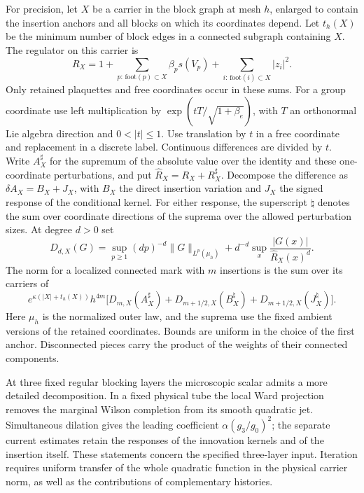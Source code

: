 \documentclass[11pt,letterpaper]{article}
\begin{document}
For precision, let \(X\) be a carrier in the block graph at mesh \(h\),
enlarged to contain the insertion anchors and all blocks on which its
coordinates depend. Let \(t_h(X)\) be the minimum number of block edges in
a connected subgraph containing \(X\). The regulator on this carrier is
\[
 R_X=1+\sum_{p:\,\mathrm{foot}(p)\subset X}\beta_p s(V_p)
          +\sum_{i:\,\mathrm{foot}(i)\subset X}|z_i|^2 .
\]
Only retained plaquettes and free coordinates occur in these sums.
For a group coordinate use left multiplication by
\(\exp(tT/\sqrt{1+\beta_e})\), with \(T\) an orthonormal Lie algebra
direction and \(0<|t|\le1\). Use translation by \(t\) in a free coordinate
and replacement in a discrete label. Continuous differences are divided by
\(t\). Write \(A_X^\sharp\) for the supremum of the absolute value over the
identity and these one-coordinate perturbations, and put
\(\widehat R_X=R_X+R_X^\sharp\). Decompose the difference as
\(\delta A_X=B_X+J_X\), with \(B_X\) the direct insertion variation and
\(J_X\) the signed response of the conditional kernel. For either response,
the superscript \(\natural\) denotes the sum over coordinate directions of the
suprema over the allowed perturbation sizes. At degree \(d>0\) set
\[
 D_{d,X}(G)=
 \sup_{p\ge1}(dp)^{-d}\|G\|_{L^p(\mu_h)}
       +d^{-d}\sup_x\frac{|G(x)|}{\widehat R_X(x)^d} .
\]
The norm for a localized connected mark with \(m\) insertions is the sum
over its carriers of
\[
 e^{\kappa(|X|+t_h(X))}h^{4m}
 \big[D_{m,X}(A_X^\sharp)+D_{m+1/2,X}(B_X^\natural)
                         +D_{m+1/2,X}(J_X^\natural)\big].
\]
Here \(\mu_h\) is the normalized outer law, and the suprema use the fixed
ambient versions of the retained coordinates. Bounds are uniform in the
choice of the first anchor. Disconnected pieces carry the product of the
weights of their connected components.

At three fixed regular blocking layers the microscopic scalar admits
a more detailed decomposition. In a fixed physical tube the local Ward
projection removes the marginal Wilson completion from its smooth
quadratic jet. Simultaneous dilation gives the leading coefficient
\(\alpha(g_3/g_0)^2\); the separate current estimates retain the
responses of the innovation kernels and of the insertion itself.
These statements concern the specified three-layer input. Iteration
requires uniform transfer of the whole quadratic function in the
physical carrier norm, as well as the contributions of complementary
histories.

\end{document}
